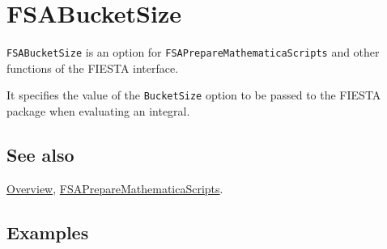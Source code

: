 \documentclass[../FeynHelpersManual.tex]{subfiles}
\begin{document}
\begin{Shaded}
\begin{Highlighting}[]
 
\end{Highlighting}
\end{Shaded}

\hypertarget{fsabucketsize}{
\section{FSABucketSize}\label{fsabucketsize}}

\texttt{FSABucketSize} is an option for
\texttt{FSAPrepareMathematicaScripts} and other functions of the FIESTA
interface.

It specifies the value of the \texttt{BucketSize} option to be passed to
the FIESTA package when evaluating an integral.

\subsection{See also}

\hyperlink{toc}{Overview},
\hyperlink{fsapreparemathematicascripts}{FSAPrepareMathematicaScripts}.

\subsection{Examples}
\end{document}
